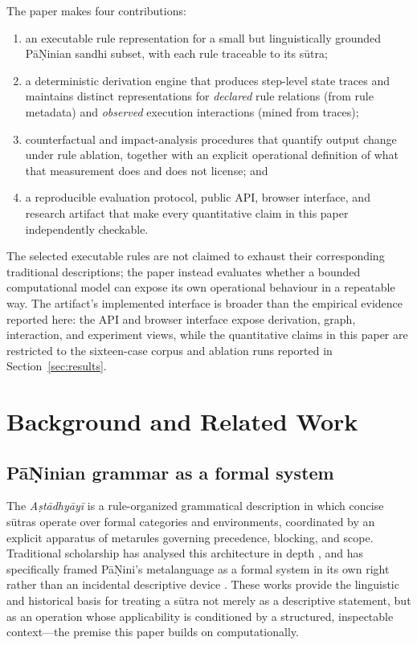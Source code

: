 \documentclass[conference]{IEEEtran}
\begin{document}
The paper makes four contributions:
\begin{enumerate}[leftmargin=*]
  \item an executable rule representation for a small but linguistically grounded P\={a}\d{N}inian sandhi subset, with each rule traceable to its s\=utra;
  \item a deterministic derivation engine that produces step-level state traces and maintains distinct representations for \emph{declared} rule relations (from rule metadata) and \emph{observed} execution interactions (mined from traces);
  \item counterfactual and impact-analysis procedures that quantify output change under rule ablation, together with an explicit operational definition of what that measurement does and does not license; and
  \item a reproducible evaluation protocol, public API, browser interface, and research artifact that make every quantitative claim in this paper independently checkable.
\end{enumerate}

The selected executable rules are not claimed to exhaust their corresponding traditional descriptions; the paper instead evaluates whether a bounded computational model can expose its own operational behaviour in a repeatable way. The artifact's implemented interface is broader than the empirical evidence reported here: the API and browser interface expose derivation, graph, interaction, and experiment views, while the quantitative claims in this paper are restricted to the sixteen-case corpus and ablation runs reported in Section~\ref{sec:results}.

\section{Background and Related Work}
\subsection{P\={a}\d{N}inian grammar as a formal system}
The \textit{A\d{s}t\=adhy\=ay\=i} is a rule-organized grammatical description in which concise s\=utras operate over formal categories and environments, coordinated by an explicit apparatus of metarules governing precedence, blocking, and scope. Traditional scholarship has analysed this architecture in depth \cite{panini1910,cardona1997,kiparsky1969,staal1969}, and has specifically framed P\={a}\d{N}ini's metalanguage as a formal system in its own right rather than an incidental descriptive device \cite{staal1969}. These works provide the linguistic and historical basis for treating a s\=utra not merely as a descriptive statement, but as an operation whose applicability is conditioned by a structured, inspectable context---the premise this paper builds on computationally.
\end{document}

